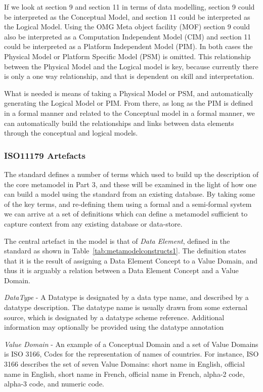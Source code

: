 \documentclass{article}
\begin{document}
If we look at section 9 and section 11 in terms of data modelling, section 9 could be interpreted as the Conceptual Model, and section 11 could be interpreted as the Logical Model. Using the OMG Meta object facility (MOF) section 9 could also be interpreted as a Computation Independent Model (CIM) and section 11 could be interpreted as a Platform Independent Model (PIM). In both cases the Physical Model or Platform Specific Model (PSM) is omitted. This relationship between the Physical Model and the Logical model is key, because currently there is only a one way relationship, and that is dependent on skill and interpretation.

What is needed is means of taking a Physical Model or PSM, and automatically generating the Logical Model or PIM. From there, as long as the PIM is defined in a formal manner and related to the Conceptual model in a formal manner, we can automatically build the relationships and links between data elements through the conceptual and logical models.

\subsubsection{ISO11179 Artefacts}

The standard defines a number of terms which used to build up the description of the core metamodel in Part 3, and these will be examined in the light of how one can build a model using the standard from an existing database. By taking some of the key terms, and re-defining them using a formal and a semi-formal system we can arrive at a set of definitions which can define a metamodel sufficient to capture context from any existing database or data-store.

The central artefact in the model is that of \emph{Data Element}, defined in the standard as shown in Table~\ref{tab:metamodelconstructs1}.  The definition states that it is the result of assigning a Data Element Concept to a Value Domain, and thus it is arguably a relation between a Data Element Concept and a Value Domain.


\emph{DataType} - A Datatype is designated by a data type name, and described by a datatype description. The datatype name is usually drawn from some external source, which is designated by a datatype scheme reference. Additional information may optionally be provided using the datatype annotation 

\emph{Value Domain} - An example of a Conceptual Domain and a set of Value Domains is ISO 3166, Codes for the representation of names of countries. For instance, ISO 3166 describes the set of seven Value Domains: short name in English, official name in English, short name in French, official name in French, alpha-2 code, alpha-3 code, and numeric code.
\end{document}
